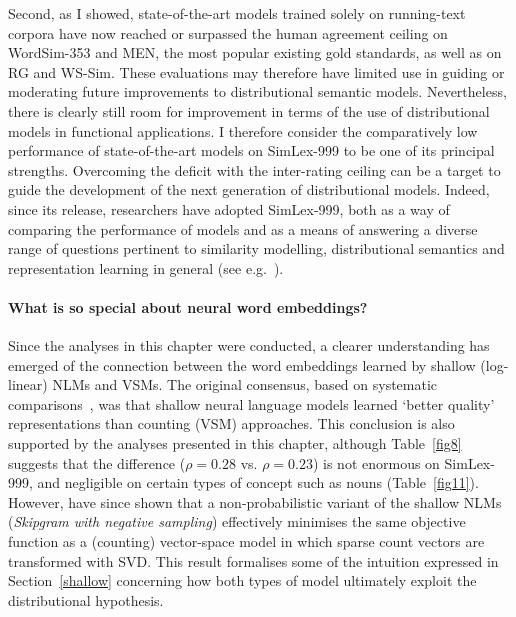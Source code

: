 Second, as I showed, state-of-the-art models trained solely on running-text corpora have now reached or surpassed the human agreement ceiling on WordSim-353 and MEN, the most popular existing gold standards, as well as on RG and WS-Sim. These evaluations may therefore have limited use in guiding or moderating future improvements to distributional semantic models. Nevertheless, there is clearly still room for improvement in terms of the use of distributional models in functional applications. I therefore consider the comparatively low performance of state-of-the-art models on SimLex-999 to be one of its principal strengths. Overcoming the deficit with the inter-rating ceiling can be a target to guide the development of the next generation of distributional models. Indeed, since its release, researchers have adopted SimLex-999, both as a way of comparing the performance of models and as a means of answering a diverse range of questions pertinent to similarity modelling, distributional semantics and representation learning in general (see e.g.~\citep{levy2015improving,wang2015learning}).

\paragraph{What is so special about neural word embeddings?}

Since the analyses in this chapter were conducted, a clearer understanding has emerged of the connection between the word embeddings learned by shallow (log-linear) NLMs and VSMs. The original consensus, based on systematic comparisons~\citep{baroni2014don}, was that shallow neural language models learned `better quality' representations than counting (VSM) approaches. This conclusion is also supported by the analyses presented in this chapter, although Table~\ref{fig8} suggests that the difference (\(\rho = 0.28\) vs. \(\rho = 0.23\)) is not enormous on SimLex-999, and negligible on certain types of concept such as nouns (Table~\ref{fig11}). However, \cite{levy2014neural} have since shown that a non-probabilistic variant of the shallow NLMs (\emph{Skipgram with negative sampling}) effectively minimises the same objective function as a (counting) vector-space model in which sparse count vectors are transformed with SVD. This result formalises some of the intuition expressed in Section~\ref{shallow} concerning how both types of model ultimately exploit the distributional hypothesis. 

